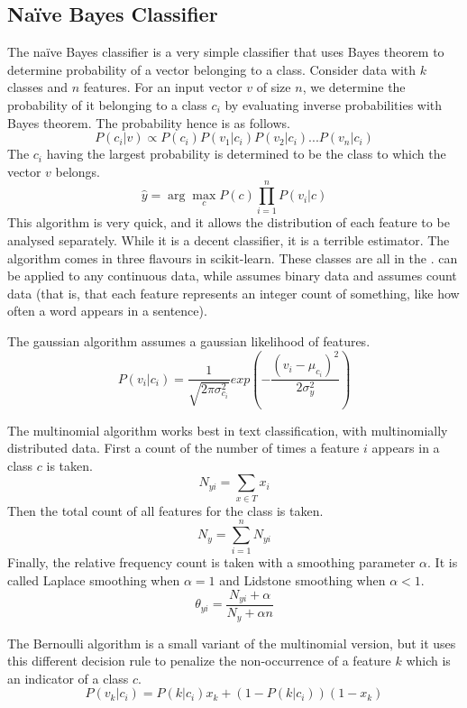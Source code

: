 \documentclass{article}
\newcommand{\code}[1]{{\fontfamily{zi4} \selectfont{#1}}}
\begin{document}
\subsection{Na{\"i}ve Bayes Classifier}
The na{\"i}ve Bayes classifier is a very simple classifier that uses Bayes theorem to determine probability of a vector belonging to a class. Consider data with $k$ classes and $n$ features. For an input vector $v$ of size $n$, we determine the probability of it belonging to a class $c_i$ by evaluating inverse probabilities with Bayes theorem. The probability hence is as follows.
$$P(c_i|v)  \propto P(c_i) P(v_1|c_i) P(v_2|c_i) ... P(v_n|c_i)$$
The $c_i$ having the largest probability is determined to be the class to which the vector $v$ belongs. 
$$\hat{y} = \arg \max_c P(c) \prod_{i=1}^n P(v_i|c)$$
This algorithm is very quick, and it allows the distribution of each feature to be analysed separately. While it is a decent classifier, it is a terrible estimator. The algorithm comes in three flavours in scikit-learn. These classes are all in the \code{sklearn.naive\_bayes}. \code{GaussianNB} can be applied to any continuous data, while \code{BernoulliNB} assumes binary data and \code{MultinomialNB} assumes count data (that is, that each feature represents an integer count of something, like how often a word appears in a sentence).

The gaussian algorithm assumes a gaussian likelihood of features. 
$$P(v_i|c_i) = \frac{1}{\sqrt{2 \pi \sigma^2_{c_i}}} exp \left( - \frac{(v_i - \mu_{c_i})^2}{2 \sigma^2_y} \right)$$

The multinomial algorithm works best in text classification, with multinomially distributed data. First a count of the number of times a feature $i$ appears in a class $c$ is taken. 
$$N_{yi} = \sum_{x \in T} x_i$$
Then the total count of all features for the class is taken.
$$N_y = \sum_{i=1}^n N_{yi}$$
Finally, the relative frequency count is taken with a smoothing parameter $\alpha$. It is called Laplace smoothing when $\alpha = 1$ and Lidstone smoothing when $\alpha < 1$.
$$\hat{\theta_{yi}} = \frac{N_{yi} + \alpha}{N_y + \alpha n}$$

The Bernoulli algorithm is a small variant of the multinomial version, but it uses this different decision rule to penalize the non-occurrence of a feature $k$ which is an indicator of a class $c$. 
$$P(v_k|c_i) = P(k|c_i) x_k + (1-P(k|c_i))(1 - x_k)$$
\end{document}
